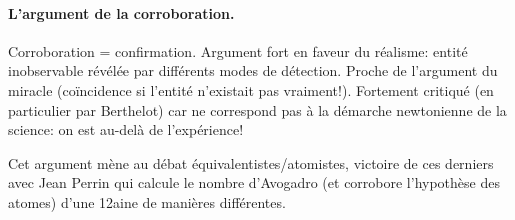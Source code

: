 \documentclass{report}
\begin{document}
	\paragraph{L’argument de la corroboration.} Corroboration = confirmation. Argument fort en faveur du réalisme: entité inobservable révélée par différents modes de détection. Proche de l’argument du miracle (coïncidence si l’entité n’existait pas vraiment!). Fortement critiqué (en particulier par Berthelot) car ne correspond pas à la démarche newtonienne de la science: on est au-delà de l’expérience!
	
	Cet argument mène au débat équivalentistes/atomistes, victoire de ces derniers avec Jean Perrin qui calcule le nombre d'Avogadro (et corrobore l'hypothèse des atomes) d'une 12aine de manières différentes.
	
	
	
\end{document}
